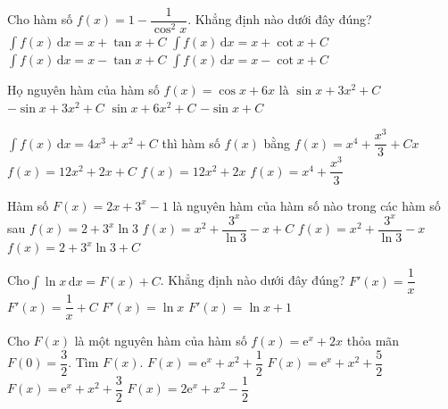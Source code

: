 \begin{ex}%
	Cho hàm số $ f(x)=1-\dfrac{1}{\cos^2 x}$. Khẳng định nào dưới đây đúng?
	\choice
	{$\displaystyle\int f(x)\mathrm{\,d}x=x+\tan x+C$}
	{$\displaystyle\int f(x)\mathrm{\,d}x=x+\cot x+C$}
	{\True $\displaystyle\int f(x)\mathrm{\,d}x=x-\tan x+C$}
	{$\displaystyle\int f(x)\mathrm{\,d}x=x-\cot x+C$}
\end{ex}

\begin{ex}%
	Họ nguyên hàm của hàm số $f(x)=\cos x+6x$ là
	\choice
	{\True $\sin x+3x^2+C$}
	{$-\sin x+3x^2+C$}
	{$\sin x+6x^2+C$}
	{$-\sin x+C$}
\end{ex}

\begin{ex}%
	$\displaystyle\int f(x)\mathrm{\,d}x=4x^3+x^2+C$ thì hàm số $f(x)$ bằng
	\choice
	{$f(x)=x^4+\dfrac{x^3}{3}+Cx$}
	{$f(x)=12x^2+2x+C$}
	{\True $f(x)=12x^2+2x$}
	{$f(x)=x^4+\dfrac{x^3}{3}$}
\end{ex}

\begin{ex}%
	Hàm số $F(x)=2x+3^x-1$ là nguyên hàm của hàm số nào trong các hàm số sau
	\choice
	{\True $f(x)=2+3^x\ln 3$}
	{$f(x)=x^2+\dfrac{3^x}{\ln 3}-x+C$}
	{$f(x)=x^2+\dfrac{3^x}{\ln 3}-x$}
	{$f(x)=2+3^x\ln 3+C$}
\end{ex}

\begin{ex}%
	Cho$\displaystyle\int \ln x \mathrm{\,d}x=F(x)+C$. Khẳng định nào dưới đây đúng?
	\choice
	{$F'(x)=\dfrac{1}{x}$}
	{$F'(x)=\dfrac{1}{x}+C$} 
	{\True $F'(x)=\ln x$}
	{$F'(x)=\ln x+1$}
\end{ex}

\begin{ex}%
	Cho $F(x)$ là một nguyên hàm của hàm số $f(x)=\mathrm{e}^x+2x$ thỏa mãn $F(0)=\dfrac{3}{2}$. Tìm $F(x)$.
	\choice
	{\True $F(x)=\mathrm{e}^x+x^2+\dfrac{1}{2}$}
	{$F(x)=\mathrm{e}^x+x^2+\dfrac{5}{2}$}
	{$F(x)=\mathrm{e}^x+x^2+\dfrac{3}{2}$}
	{$F(x)=2\mathrm{e}^x+x^2-\dfrac{1}{2}$}
\end{ex}

